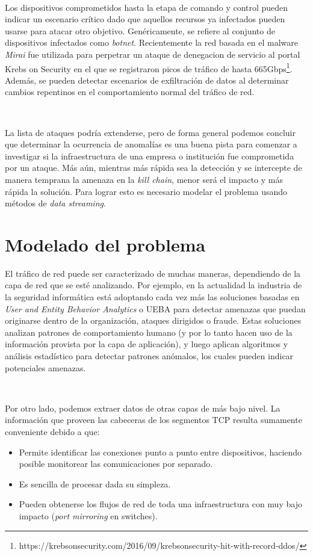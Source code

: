 \documentclass[a4paper,12pt, oneside]{article}
\begin{document}
\

Los dispositivos comprometidos hasta la etapa de comando y control pueden indicar un escenario crítico dado que aquellos recursos ya infectados pueden usarse para atacar otro objetivo. Genéricamente, se refiere al conjunto de dispositivos infectados como \textit{botnet}. Recientemente la red basada en el malware \textit{Mirai} fue utilizada para perpetrar un ataque de denegacion de servicio al portal Krebs on Security en el que se registraron picos de tráfico de hasta 665Gbps\footnote{https://krebsonsecurity.com/2016/09/krebsonsecurity-hit-with-record-ddos/}. Además, se pueden detectar escenarios de exfiltración de datos al determinar cambios repentinos en el comportamiento normal del tráfico de red.

\

La lista de ataques podría extenderse, pero de forma general podemos concluir que determinar la ocurrencia de anomalías es una buena pista para comenzar a investigar si la infraestructura de una empresa o institución fue comprometida por un ataque. Más aún, mientras más rápida sea la detección y se intercepte de manera temprana la amenaza en la \textit{kill chain}, menor será el impacto y más rápida la solución. Para lograr esto es necesario modelar el problema usando métodos de \textit{data streaming}.

\newpage 

\section{Modelado del problema}\label{sec:modelado_del_problema}
El tráfico de red puede ser caracterizado de muchas maneras, dependiendo de la capa de red que se esté analizando. Por ejemplo, en la actualidad la industria de la seguridad informática está adoptando cada vez más las soluciones basadas en \textit{User and Entity Behavior Analytics} o UEBA para detectar amenazas que puedan originarse dentro de la organización, ataques dirigidos o fraude. Estas soluciones analizan patrones de comportamiento humano (y por lo tanto hacen uso de la información provista por la capa de aplicación), y luego aplican algoritmos y análisis estadístico para detectar patrones anómalos, los cuales pueden indicar potenciales amenazas.

\

Por otro lado, podemos extraer datos de otras capas de más bajo nivel. La información que proveen las cabeceras de los segmentos TCP resulta sumamente conveniente debido a que:
\begin{itemize}
	\item Permite identificar las conexiones punto a punto entre dispositivos, haciendo posible monitorear las comunicaciones por separado.
	\item Es sencilla de procesar dada su simpleza.
	\item Pueden obtenerse los flujos de red de toda una infraestructura con muy bajo impacto (\textit{port mirroring} en switches).
\end{itemize}
\end{document}
